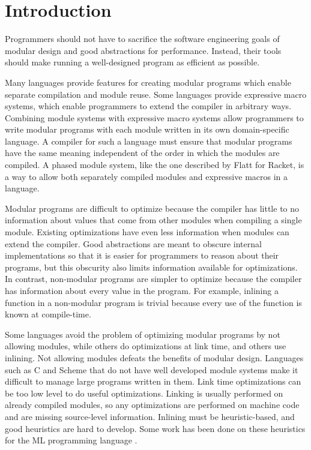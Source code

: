 \chapter{Introduction}
\label{chap:introduction}

Programmers should not have to sacrifice the software engineering goals of modular design and good abstractions for performance. 
Instead, their tools should make running a well-designed program as efficient as possible. 

Many languages provide features for creating modular programs which enable separate compilation and module reuse.
Some languages provide expressive macro systems, which enable programmers to extend the compiler in arbitrary ways.
Combining module systems with expressive macro systems allow programmers to write modular programs with each module written in its own domain-specific language.
A compiler for such a language must ensure that modular programs have the same meaning independent of the order in which the modules are compiled.
A phased module system, like the one described by Flatt \cite{Flatt} for Racket, is a way to allow both separately compiled modules and expressive macros in a language.

Modular programs are difficult to optimize because the compiler has little to no information about values that come from other modules when compiling a single module.
Existing optimizations have even less information when modules can extend the compiler. 
Good abstractions are meant to obscure internal implementations so that it is easier for programmers to reason about their programs, but this obscurity also limits information available for optimizations.  
In contrast, non-modular programs are simpler to optimize because the compiler has information about every value in the program.
For example, inlining a function in a non-modular program is trivial because every use of the function is known at compile-time.

Some languages avoid the problem of optimizing modular programs by not allowing modules, while others do optimizations at link time, and others use inlining. 
Not allowing modules defeats the benefits of modular design. 
Languages such as C and Scheme that do not have well developed module systems make it difficult to manage large programs written in them.
Link time optimizations can be too low level to do useful optimizations.
Linking is usually performed on already compiled modules, so any optimizations are performed on machine code and are missing source-level information.
Inlining must be heuristic-based, and good heuristics are hard to develop. 
Some work has been done on these heuristics for the ML programming language \cite{258960}.

